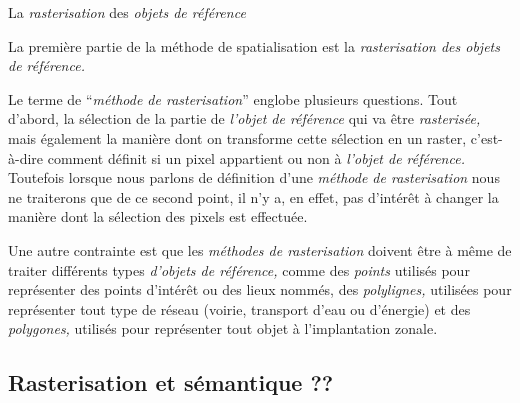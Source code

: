La \emph{rasterisation} des \emph{objets de référence}

La première partie de la méthode de spatialisation est la
\emph{rasterisation des objets de référence.}

Le terme de \enquote{\emph{méthode de rasterisation}} englobe plusieurs questions. Tout d'abord, la sélection de la partie de \emph{l'objet de référence} qui va être \emph{rasterisée,} mais également la manière dont on transforme cette sélection en un raster, c'est-à-dire comment définit si un pixel appartient ou non à \emph{l'objet de référence.} Toutefois lorsque nous parlons de définition d'une \emph{méthode de rasterisation} nous ne traiterons que de ce second point, il n'y a, en effet, pas d’intérêt à changer la manière dont la sélection des pixels est effectuée. 

Une autre contrainte est que les \emph{méthodes de rasterisation} doivent être à même de traiter différents types \emph{d'objets de référence,} comme des \emph{points} utilisés pour représenter des points d’intérêt ou des lieux nommés, des \emph{polylignes,} utilisées pour représenter tout type de réseau (\eg voirie, transport d'eau ou d'énergie) et des \emph{polygones,} utilisés pour représenter tout objet à l’implantation zonale.

\subsection{Rasterisation et sémantique ??}


